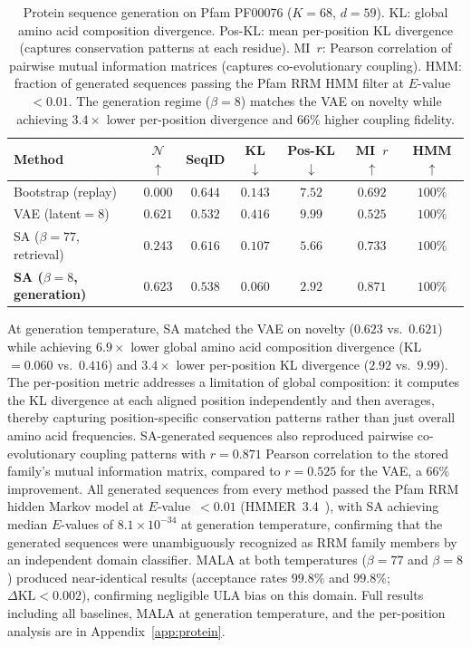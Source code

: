 \begin{table}[t]
\centering
\caption{Protein sequence generation on Pfam PF00076 ($K{=}68$, $d{=}59$). KL: global amino acid composition divergence. Pos-KL: mean per-position KL divergence (captures conservation patterns at each residue). MI~$r$: Pearson correlation of pairwise mutual information matrices (captures co-evolutionary coupling). HMM: fraction of generated sequences passing the Pfam RRM HMM filter at $E$-value~$<0.01$. The generation regime ($\beta{=}8$) matches the VAE on novelty while achieving $3.4{\times}$ lower per-position divergence and $66\%$ higher coupling fidelity.}
\label{tab:protein-main}
\small
\begin{tabular}{@{}lcccccc@{}}
\toprule
Method & $\mathcal{N}$ $\uparrow$ & SeqID & KL $\downarrow$ & Pos-KL $\downarrow$ & MI~$r$ $\uparrow$ & HMM $\uparrow$ \\
\midrule
Bootstrap (replay)                  & $0.000$ & $0.644$ & $0.143$ & $7.52$ & $0.692$ & $100\%$ \\
VAE (latent${=}8$)                  & $0.621$ & $0.532$ & $0.416$ & $9.99$ & $0.525$ & $100\%$ \\
SA ($\beta{=}77$, retrieval)        & $0.243$ & $0.616$ & $0.107$ & $5.66$ & $0.733$ & $100\%$ \\
\textbf{SA ($\beta{=}8$, generation)} & $\mathbf{0.623}$ & $0.538$ & $\mathbf{0.060}$ & $\mathbf{2.92}$ & $\mathbf{0.871}$ & $100\%$ \\
\bottomrule
\end{tabular}
\end{table}

At generation temperature, SA matched the VAE on novelty ($0.623$ vs.\ $0.621$) while achieving $6.9{\times}$ lower global amino acid composition divergence (KL$=0.060$ vs.\ $0.416$) and $3.4{\times}$ lower per-position KL divergence ($2.92$ vs.\ $9.99$). The per-position metric addresses a limitation of global composition: it computes the KL divergence at each aligned position independently and then averages, thereby capturing position-specific conservation patterns rather than just overall amino acid frequencies. SA-generated sequences also reproduced pairwise co-evolutionary coupling patterns with $r{=}0.871$ Pearson correlation to the stored family's mutual information matrix, compared to $r{=}0.525$ for the VAE, a $66\%$ improvement. All generated sequences from every method passed the Pfam RRM hidden Markov model at $E$-value~$<0.01$ (HMMER~3.4~\cite{hmmer3}), with SA achieving median $E$-values of $8.1{\times}10^{-34}$ at generation temperature, confirming that the generated sequences were unambiguously recognized as RRM family members by an independent domain classifier. MALA at both temperatures ($\beta{=}77$ and $\beta{=}8$) produced near-identical results (acceptance rates $99.8\%$ and $99.8\%$; $\Delta\mathrm{KL}<0.002$), confirming negligible ULA bias on this domain. Full results including all baselines, MALA at generation temperature, and the per-position analysis are in Appendix~\ref{app:protein}.

